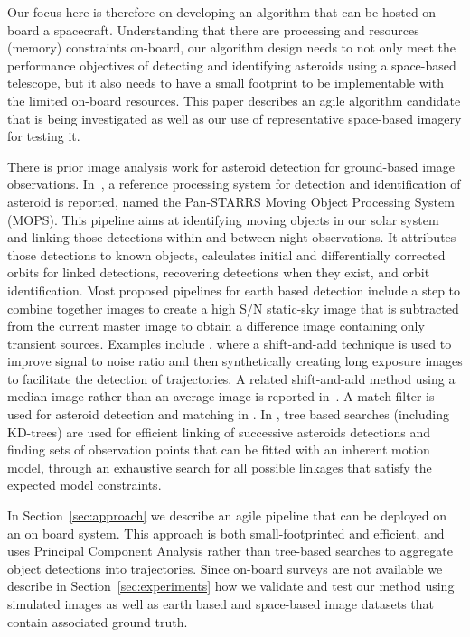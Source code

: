 \documentclass{article}
\begin{document}
Our focus here is therefore on developing an algorithm that can be hosted on-board a spacecraft.  Understanding that there are processing and resources (memory) constraints on-board, our algorithm design needs to not only meet the performance objectives of detecting and identifying asteroids using a space-based telescope, but it also needs to have a small footprint to be implementable with the limited on-board resources.  This paper describes an agile algorithm candidate that is being investigated as well as our use of representative space-based imagery for testing it.

There is prior image analysis work for asteroid detection for ground-based image observations. In~\cite{denneau2013pan}, a reference processing system for detection and identification of asteroid is reported, named the Pan-STARRS Moving Object Processing System (MOPS). This pipeline aims at identifying moving objects in our solar system and linking those detections within and between night observations. It attributes those detections to known objects, calculates initial and differentially corrected orbits for linked detections, recovering detections when they exist, and orbit identification. Most proposed pipelines for earth based detection include a step to combine together images to create a high S/N static-sky image that is subtracted from the current master image to obtain a difference image containing only transient sources. Examples include \cite{shao2014finding}, where a shift-and-add technique is used to improve  signal to noise ratio and then synthetically creating long exposure images to facilitate the detection of trajectories. A related shift-and-add method using a median  image rather than an average image is reported in~\cite{yanagisawa2005automatic}. A match filter is used for asteroid detection and matching in \cite{gural2005matched}. In \cite{kubica2005variable,kubica2005multiple,kubica2007efficient}, tree based searches (including KD-trees) are used for efficient linking of successive asteroids detections and finding sets of observation points that can be fitted with an inherent motion model, through an exhaustive search for all possible linkages that satisfy the expected model constraints.
	
In Section~\ref{sec:approach} we describe an agile pipeline that can be deployed on an on board system. This approach is both small-footprinted and efficient, and uses Principal Component Analysis rather than tree-based searches to aggregate object detections into trajectories. Since on-board surveys are not available we describe in Section~\ref{sec:experiments} how we validate and test our method using simulated images as well as earth based and space-based image datasets that contain associated ground truth.
\end{document}
